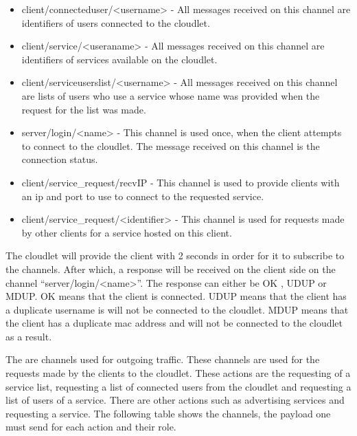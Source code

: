 \begin{itemize}
\item client/connecteduser/<username> - All messages received on this channel are identifiers of users connected to the cloudlet.
\item client/service/<useraname> -  All messages received on this channel are identifiers of services available on the cloudlet.
\item client/serviceuserslist/<username> -  All messages received on this channel are lists of users who use a service whose name was provided when the request for the list was made.
\item server/login/<name> - This channel is used once, when the client attempts to connect to the cloudlet. The message received on this channel is the connection status.
\item client/service\_request/recvIP - This channel is used to provide clients with an ip and port to use to connect to the requested service.
\item client/service\_request/<identifier> - This channel is used for requests made by other clients for a service hosted on this client.
\end{itemize}

The cloudlet will provide the client with 2 seconds in order for it to subscribe to the channels. After which, a response will be received on the client side on the channel “server/login/<name>”. The response can either be OK , UDUP or MDUP. OK means that the client is connected. UDUP means that the client has a duplicate username is will not be connected to the cloudlet. MDUP means that the client has a duplicate mac address and will not be connected to the cloudlet as a result.\newline

The are channels used for outgoing traffic. These channels are used for the requests made by the clients to the cloudlet. These actions are the requesting of a service list, requesting a list of connected users from the cloudlet and requesting a list of users of a service. There are other actions such as advertising services and requesting a service. The following table shows the channels, the payload one must send for each action and their role.

